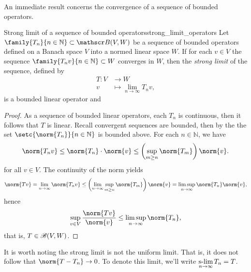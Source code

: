 An immediate result concerns the convergence of a sequence of bounded operators.
\begin{theorem}{Strong limit of a sequence of bounded operators}{strong_limit_operators}
    Let \(\family{T_n}{n\in \mathbb{N}} \subset \bounded(V,W)\) be a sequence of bounded operators defined on a Banach space \(V\) into a normed linear space \(W\). If for each \(v \in V\) the sequence \(\family{T_nv}{n \in \mathbb{N}}\subset W\) converges in \(W\), then the \emph{strong limit} of the sequence, defined by
    \begin{align*}
        T : V &\to W\\
            v &\mapsto \lim_{n\to \infty} T_n v,
    \end{align*}
    is a bounded linear operator and 
\end{theorem}
\begin{proof}
    As a sequence of bounded linear operators, each \(T_n\) is continuous, then it follows that \(T\) is linear. Recall convergent sequences are bounded, then by the  the set \(\setc{\norm{T_n}}{n \in \mathbb{N}}\) is bounded above. For each \(n \in \mathbb{N}\), we have
    \begin{equation*}
        \norm{T_n v} \leq \norm{T_n} \cdot \norm{v} \leq \left(\sup_{m \geq n}{\norm{T_m}}\right) \norm{v}.
    \end{equation*}
    for all \(v \in V\). The continuity of the norm yields
    \begin{equation*}
        \norm{Tv} = \lim_{n\to\infty}{\norm{T_n v}}\leq \left(\lim_{n\to\infty}{\sup_{m \geq n}{\norm{T_m}}}\right) \norm{v} = \limsup_{n\to\infty}{\norm{T_n}} \norm{v},
    \end{equation*}
    hence
    \begin{equation*}
        \sup_{v \in V}{\frac{\norm{Tv}}{\norm{v}}}\leq \limsup_{n\to\infty}{\norm{T_n}},
    \end{equation*}
    that is, \(T \in \mathscr{B}(V,W)\).
\end{proof}
\begin{remark}
    It is worth noting the strong limit is not the uniform limit. That is, it does not follow that \(\norm{T - T_n} \to 0\). To denote this limit, we'll write \(\displaystyle{\operatorname*{s-lim}_{n\to\infty} T_n = T}\).
\end{remark}

